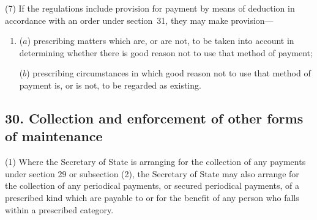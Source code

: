 \documentclass[12pt,a4paper]{article}
\begin{document}
(7) If the regulations include provision for payment by means of deduction in accordance with an order under section~31, they may make provision—
\begin{enumerate}\item[]
($a$) prescribing matters which are, or are not, to be taken into account in determining whether there is good reason not to use that method of payment;

($b$) prescribing circumstances in which good reason not to use that method of payment is, or is not, to be regarded as existing.
\end{enumerate}


\subsection{30. Collection and enforcement of other forms of maintenance}

(1) Where the 
Secretary of State  %
is arranging for the collection of any payments under section 29 or subsection (2), 
the Secretary of State  %
may also arrange for the collection of any periodical payments, or secured periodical payments, of a prescribed kind which are payable to or for the benefit of any person who falls within a prescribed category.
\end{document}
